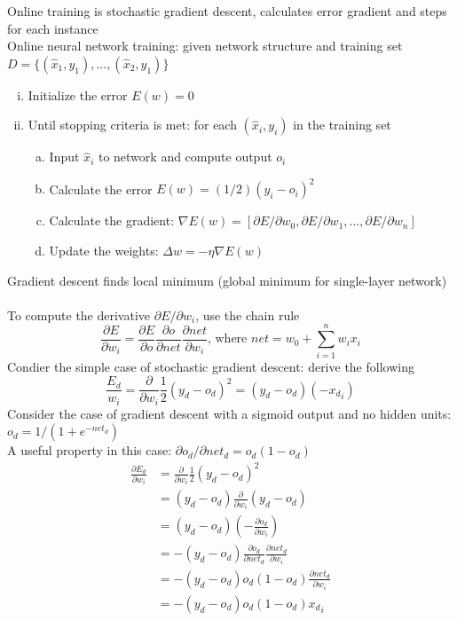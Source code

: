 \documentclass{article}
\begin{document}
			Online training is stochastic gradient descent, calculates error gradient and steps for each instance \\
			Online neural network training:  given network structure and training set $D = \{(\hat{x}_1, y_1), ..., (\hat{x}_2, y_1)\}$
			\begin{enumerate}[(i)]
				\item Initialize the error $E(w) = 0$
				\item Until stopping criteria is met: for each $(\hat{x}_i, y_i)$ in the training set
				\begin{enumerate}[(a)]
					\item Input $\hat{x}_i$ to network and compute output $o_i$ \\
					\item Calculate the error $E(w) = (1/2)(y_i - o_i)^2$
					\item Calculate the gradient: $\nabla E(w) = [\partial{E}/\partial{w_0}, \partial{E}/\partial{w_1}, ..., \partial{E}/\partial{w_n}]$
					\item Update the weights: $\Delta w = -\eta\nabla E(w)$
					\end{enumerate}
				\end{enumerate}
			Gradient descent finds local minimum (global minimum for single-layer network) \\
			\\
			To compute the derivative $\partial{E}/\partial{w_i}$, use the chain rule
			\begin{equation*}
				\frac{\partial{E}}{\partial{w_i}} = \frac{\partial{E}}{\partial{o}}\frac{\partial{o}}{\partial{net}}\frac{\partial{net}}{\partial{w_i}} \text{, where } net = w_0 + \sum\limits_{i = 1}^n w_ix_i
				\end{equation*}
			Condier the simple case of stochastic gradient descent: derive the following
			\begin{equation*}
				\frac{E_d}{w_i} = \frac{\partial}{\partial{w_i}}\frac{1}{2}(y_d - o_d)^2 = (y_d - o_d)(-{x_d}_i)
				\end{equation*}
			Consider the case of gradient descent with a sigmoid output and no hidden units: $o_d = 1/(1 + e^{-net_d})$ \\
			A useful property in this case: $\partial{o_d}/\partial{net_d} = o_d(1 - o_d)$
			\begin{align*}
				\frac{\partial{E_d}}{\partial{w_i}} &= \frac{\partial}{\partial{w_i}}\frac{1}{2}(y_d - o_d)^2 \\
				&= (y_d - o_d)\frac{\partial}{\partial{w_i}}(y_d - o_d) \\ 
				&= (y_d - o_d)\left(-\frac{\partial{o_d}}{\partial{w_i}}\right) \\
				&= -(y_d - o_d)\frac{\partial{o_d}}{\partial{net_d}}\frac{\partial{net_d}}{\partial{w_i}} \\
				&= -(y_d - o_d)o_d(1 - o_d)\frac{\partial{net_d}}{\partial{w_i}} \\
				&= -(y_d - o_d)o_d(1 - o_d){x_d}_i
				\end{align*}
\end{document}
